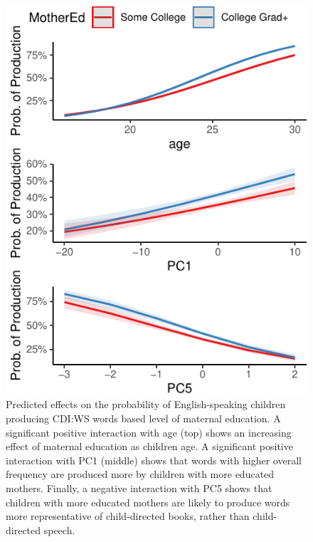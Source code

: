 \documentclass[10pt, letterpaper]{article}
\newenvironment{CodeChunk}{}{}
\begin{document}
\begin{CodeChunk}
\begin{figure}[H]

{\centering \includegraphics{figs/unnamed-chunk-10-1} 

}

\caption[Predicted effects on the probability of English-speaking children producing CDI:WS words based level of maternal education]{Predicted effects on the probability of English-speaking children producing CDI:WS words based level of maternal education. A significant positive interaction with age (top) shows an increasing effect of maternal education as children age. A significant positive interaction with PC1 (middle) shows that words with higher overall frequency are produced more by children with more educated mothers. Finally, a negative interaction with PC5 shows that children with more educated mothers are likely to produce words more representative of child-directed books, rather than child-directed speech.}\label{fig:unnamed-chunk-10}
\end{figure}
\end{CodeChunk}
\end{document}
